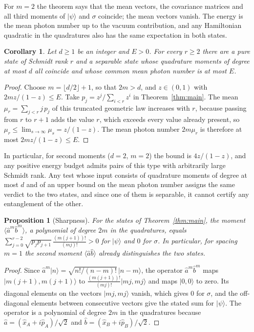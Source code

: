 \documentclass[11pt,a4paper]{article}
\newtheorem{proposition}[theorem]{Proposition}
\newtheorem{corollary}[theorem]{Corollary}
\theoremstyle{definition}
\theoremstyle{plain}
\newcommand{\ket}[1]{\lvert#1\rangle}
\begin{document}
For $m=2$ the theorem says that the mean vectors, the covariance matrices and
all third moments of $\ket{\psi}$ and $\sigma$ coincide; the mean vectors
vanish. The energy is the mean photon number up to the vacuum contribution, and
any Hamiltonian quadratic in the quadratures also has the same expectation in
both states.

\begin{corollary}\label{cor:uniform}
Let $d\ge1$ be an integer and $E>0$. For every $r\ge2$ there are a pure state
of Schmidt rank $r$ and a separable state whose quadrature moments of degree at
most $d$ all coincide and whose common mean photon number is at most $E$.
\end{corollary}

\begin{proof}
Choose $m=\lfloor d/2\rfloor+1$, so that $2m>d$, and $z\in(0,1)$ with
$2mz/(1-z)\le E$. Take $p_j=z^j/\sum_{i<r}z^i$ in Theorem~\ref{thm:main}. The
mean $\mu_r=\sum_{j<r}j\,p_j$ of this truncated geometric law increases with
$r$, because passing from $r$ to $r+1$ adds the value $r$, which exceeds every
value already present, so $\mu_r\le\lim_{s\to\infty}\mu_s=z/(1-z)$. The mean
photon number $2m\mu_r$ is therefore at most $2mz/(1-z)\le E$.
\end{proof}

In particular, for second moments ($d=2$, $m=2$) the bound is $4z/(1-z)$, and
any positive energy budget admits pairs of this type with arbitrarily large
Schmidt rank. Any test whose input consists of quadrature moments of degree at
most $d$ and of an upper bound on the mean photon number assigns the same
verdict to the two states, and since one of them is separable, it cannot
certify any entanglement of the other.

\begin{proposition}[Sharpness]\label{prop:sharp}
For the states of Theorem~\ref{thm:main}, the moment
$\langle\hat a^m\hat b^m\rangle$, a polynomial of degree $2m$ in the
quadratures, equals
$\sum_{j=0}^{r-2}\sqrt{p_jp_{j+1}}\,\frac{(m(j+1))!}{(mj)!}>0$ for $\ket\psi$
and $0$ for $\sigma$. In particular, for spacing $m=1$ the second moment
$\langle\hat a\hat b\rangle$ already distinguishes the two states.
\end{proposition}

\begin{proof}
Since $\hat a^m\ket{n}=\sqrt{n!/(n-m)!}\,\ket{n-m}$, the operator
$\hat a^m\hat b^m$ maps $\ket{m(j+1),m(j+1)}$ to
$\frac{(m(j+1))!}{(mj)!}\ket{mj,mj}$ and maps $\ket{0,0}$ to zero. Its diagonal
elements on the vectors $\ket{mj,mj}$ vanish, which gives $0$ for $\sigma$, and
the off-diagonal elements between consecutive vectors give the stated sum for
$\ket\psi$. The operator is a polynomial of degree $2m$ in the quadratures
because $\hat a=(\hat x_A+i\hat p_A)/\sqrt2$ and $\hat b=(\hat x_B+i\hat p_B)/\sqrt2$.
\end{proof}
\end{document}
